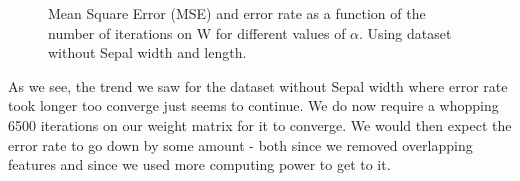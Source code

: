 \documentclass{article}
\begin{document}
\begin{figure}
    \centering
    \caption{Mean Square Error (MSE) and error rate as a function of the number of iterations on W
    for different values of $\alpha$. Using dataset without Sepal width and length.}%
    \label{fig:tuning_no_sepal_width_length}
\end{figure}

As we see, the trend we saw for the dataset without Sepal width where error rate took longer
too converge just seems to continue. We do now require a whopping 6500 iterations on our weight
matrix for it to converge. We would then expect the error rate to go down by some amount - both
since we removed overlapping features and since we used more computing power to get to it.
\end{document}
